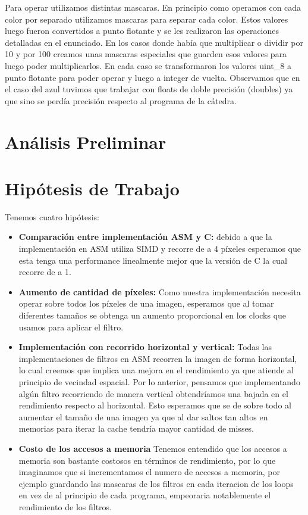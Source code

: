 \documentclass[a4paper]{article}
\begin{document}
Para operar utilizamos distintas mascaras. En principio como operamos con cada color por separado utilizamos mascaras para separar cada color. Estos valores luego fueron convertidos a punto flotante y se les realizaron las operaciones detalladas en el enunciado. En los casos donde había que multiplicar o dividir por 10 y por 100 creamos unas mascaras especiales que guarden esos valores para luego poder multiplicarlos. En cada caso se transformaron los valores uint\_8 a punto flotante para poder operar y luego a integer de vuelta. Observamos que en el caso del azul tuvimos que trabajar con floats de doble precisión (doubles) ya que sino se perdía precisión respecto al programa de la cátedra. 



\section{Análisis Preliminar}


\section{Hipótesis de Trabajo}
Tenemos cuatro hipótesis:
\begin{itemize}

  
    \item \textbf{Comparación entre implementación ASM y C:} debido a que la implementación en ASM utiliza SIMD y recorre de a 4 píxeles esperamos que esta tenga una performance linealmente mejor que la versión de C la cual recorre de a 1.
    \item \textbf{Aumento de cantidad de píxeles:} Como nuestra implementación necesita operar sobre todos los píxeles de una imagen, esperamos que al tomar diferentes tamaños se obtenga un aumento proporcional en los clocks que usamos para aplicar el filtro.
    \item \textbf{Implementación con recorrido horizontal y vertical:} Todas las implementaciones de filtros en ASM recorren la imagen de forma horizontal, lo cual creemos que implica una mejora en el rendimiento ya que atiende al principio de vecindad espacial. Por lo anterior, pensamos que implementando algún filtro recorriendo de manera vertical obtendríamos una bajada en el rendimiento respecto al horizontal. Esto esperamos que se de sobre todo al aumentar el tamaño de una imagen ya que al dar saltos tan altos en memorias para iterar la cache tendría mayor cantidad de misses.
    \item \textbf{Costo de los accesos a memoria}
    Tenemos entendido que los accesos a memoria son bastante costosos en términos de rendimiento, por lo que imaginamos que si incrementamos el numero de accesos a memoria, por ejemplo guardando las mascaras de los filtros en cada iteracion de los loops en vez de al principio de cada programa, empeoraria notablemente el rendimiento de los filtros.
\end{itemize}
\end{document}
